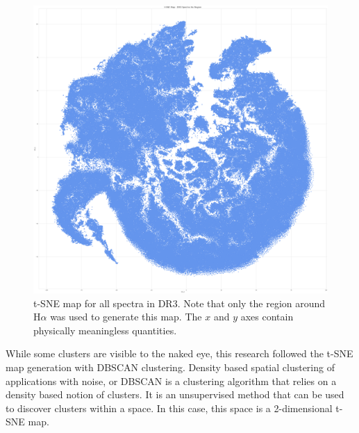\begin{figure}[h]
\centering
\includegraphics[scale=0.16]{figures/t-sne halpha masked.png}
\caption{t-SNE map for all spectra in DR3. Note that only the region around H$\alpha$ was used to generate this map. The $x$ and $y$ axes contain physically meaningless quantities.}
\end{figure}

While some clusters are visible to the naked eye, this research followed the t-SNE map generation with DBSCAN clustering. Density based spatial clustering of applications with noise, or DBSCAN is a clustering algorithm that relies on a density based notion of clusters. It is an unsupervised method that can be used to discover clusters within a space. In this case, this space is a 2-dimensional t-SNE map. 